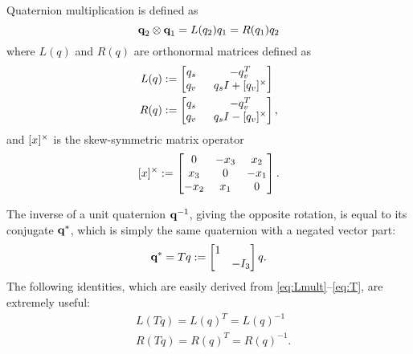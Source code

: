 \documentclass[../root.tex]{subfiles}
\begin{document}
        Quaternion multiplication is defined as
        \begin{equation} \label{eq:quat_mult}
            \textbf{q}_2 \otimes \textbf{q}_1 = L(q_2) q_1 = R(q_1) q_2
        \end{equation}
        where $L(q)$ and $R(q)$ are orthonormal matrices defined as
        \begin{align}
            L(q) &:= \begin{bmatrix} 
                q_s \;\; & -q_v^T \\ 
                q_v \;\; & q_s I + [q_v]^\times 
            \end{bmatrix} 
            \label{eq:Lmult} \\
            R(q) &:=\begin{bmatrix} 
                q_s \;\; & -q_v^T \\ 
                q_v \;\; & q_s I - [q_v]^\times 
            \end{bmatrix} \label{eq:Rmult},
        \end{align}
        and $[x]^\times$ is the skew-symmetric matrix operator
        \begin{equation}
            [x]^\times := \begin{bmatrix} 
                0 & -x_3 & x_2 \\ 
                x_3 & 0 & -x_1\\ 
                -x_2 & x_1 & 0 
            \end{bmatrix}.
        \end{equation}
        
        The inverse of a unit quaternion $\textbf{q}^{-1}$, giving the opposite rotation, is equal 
        to its conjugate $\textbf{q}^*$, which is simply the same quaternion with a negated vector 
        part:
        \begin{equation} \label{eq:T}
            \textbf{q}^* = T q := \begin{bmatrix} 
                1 & \\ 
                & -I_3 
            \end{bmatrix} q.
        \end{equation}
        The following identities, which are easily derived from
        \eqref{eq:Lmult}--\eqref{eq:T}, are extremely useful:
        \begin{align}
            &L(Tq) = L(q)^T = L(q)^{-1} \\
            &R(Tq) = R(q)^T = R(q)^{-1} .
        \end{align}
        
\end{document}
